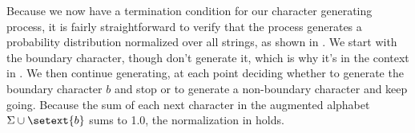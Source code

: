 Because we now have a termination condition for our character
generating process, it is fairly straightforward to verify that the
process generates a probability distribution normalized over all
strings, as shown in .  We start with the boundary
character, though don't generate it, which is why it's in the context
in .  We then continue generating, at each point
deciding whether to generate the boundary character $b$ and stop or to
generate a non-boundary character and keep going.  Because the sum of
each next character in the augmented alphabet $\Sigma \cup \setext{b}$
sums to 1.0, the normalization in  holds.











